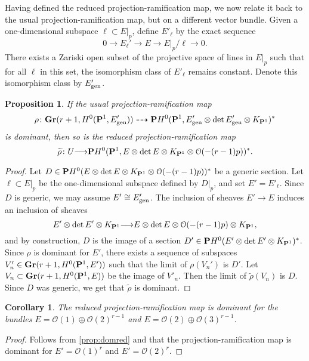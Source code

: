 \documentclass[11pt,reqno]{amsart}
\theoremstyle{plain}
\newtheorem{proposition}[theorem]{Proposition}
\newtheorem{corollary}[theorem]{Corollary}
\theoremstyle{definition}
\theoremstyle{remark}
\numberwithin{equation}{section}
\renewcommand{\to}{{\longrightarrow}}
\numberwithin{equation}{section}
\renewcommand{\O}{\mathcal O}
\begin{document}
Having defined the reduced projection-ramification map, we now relate it back to the usual projection-ramification map, but on a different vector bundle.
Given a one-dimensional subspace $\ell \subset E|_p$, define $E'_\ell$ by the exact sequence
\[ 0 \to E_\ell' \to E \to E|_p/\ell\to 0.\]
There exists a Zariski open subset of the projective space of lines in $E|_p$ such that for all $\ell$ in this set, the isomorphism class of $E'_{\ell}$ remains constant.
Denote this isomorphism class by $E'_{\rm gen}$.
\begin{proposition}\label{prop:domred}
  If the usual projection-ramification map
  \[ \rho \from \Gr(r+1, H^0(\P^1, E'_{\rm gen})) \dashrightarrow \P H^0(\P^1, E'_{\rm gen} \otimes \det E'_{\rm gen} \otimes K_{\P^1})^*\]
  is dominant, then so is the reduced projection-ramification map
  \[\widetilde \rho \from U \to \P H^0(\P^1, E \otimes \det E \otimes K_{\P^1} \otimes \O(-(r-1)p))^*.\]
\end{proposition}
\begin{proof}
  Let $D \in \P H^0(E \otimes \det E \otimes K_{\P^1} \otimes \O(-(r-1)p))^*$ be a generic section.
  Let $\ell \subset E|_p$ be the one-dimensional subspace defined by $D|_p$, and set $E' = E'_{\ell}$.
  Since $D$ is generic, we may assume $E' \cong E'_{\rm gen}$.
  The inclusion of sheaves $E' \to E$ induces an inclusion of sheaves
  \[
    E' \otimes \det E' \otimes K_{\P^1} \to E \otimes \det E \otimes \O(-(r-1)p) \otimes K_{\P^1},
  \]
  and by construction, $D$ is the image of a section $D' \in \P H^0(E' \otimes \det E' \otimes K_{\P^1})^*$.
  Since $\rho$ is dominant for $E'$, there exists a sequence of subspaces $V_n' \in \Gr(r+1, H^0(\P^1, E'))$ such that the limit of $\rho(V_n')$ is $D'$.
  Let $V_n \subset \Gr(r+1, H^0(\P^1, E))$ be the image of $V'_n$.
  Then the limit of $\widetilde \rho(V_n)$ is $D$.
  Since $D$ was generic, we get that $\widetilde \rho$ is dominant.
\end{proof}

\begin{corollary}\label{prop:domredexamples}
  The reduced projection-ramification map is dominant for the bundles $E = \O(1) \oplus \O(2)^{r-1}$ and $E = \O(2) \oplus \O(3)^{r-1}$.
\end{corollary}
\begin{proof}
  Follows from \autoref{prop:domred} and that the projection-ramification map is dominant for $E' = \O(1)^r$ and $E' = \O(2)^r$.
\end{proof}
\end{document}
